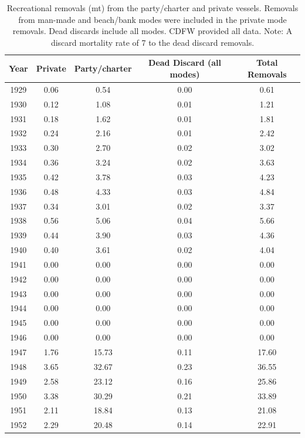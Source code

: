 \documentclass[12pt,]{article}
\begin{document}
\begin{longtable}{ccccc}
\caption{Recreational removals (mt) from the party/charter 
                                        and private vessels. Removals from man-made and 
                                        beach/bank modes were included in the private mode
                                        removals. Dead discards include all modes. CDFW provided 
                                        all data. Note: A discard mortality rate of 7%
                                        to the dead discard removals.} \\ 
  \hline
Year & Private & Party/charter & Dead Discard (all modes) & Total Removals \\ 
  \hline \endhead  \hline
1929 & 0.06 & 0.54 & 0.00 & 0.61 \\ 
  1930 & 0.12 & 1.08 & 0.01 & 1.21 \\ 
  1931 & 0.18 & 1.62 & 0.01 & 1.81 \\ 
  1932 & 0.24 & 2.16 & 0.01 & 2.42 \\ 
  1933 & 0.30 & 2.70 & 0.02 & 3.02 \\ 
  1934 & 0.36 & 3.24 & 0.02 & 3.63 \\ 
  1935 & 0.42 & 3.78 & 0.03 & 4.23 \\ 
  1936 & 0.48 & 4.33 & 0.03 & 4.84 \\ 
  1937 & 0.34 & 3.01 & 0.02 & 3.37 \\ 
  1938 & 0.56 & 5.06 & 0.04 & 5.66 \\ 
  1939 & 0.44 & 3.90 & 0.03 & 4.36 \\ 
  1940 & 0.40 & 3.61 & 0.02 & 4.04 \\ 
  1941 & 0.00 & 0.00 & 0.00 & 0.00 \\ 
  1942 & 0.00 & 0.00 & 0.00 & 0.00 \\ 
  1943 & 0.00 & 0.00 & 0.00 & 0.00 \\ 
  1944 & 0.00 & 0.00 & 0.00 & 0.00 \\ 
  1945 & 0.00 & 0.00 & 0.00 & 0.00 \\ 
  1946 & 0.00 & 0.00 & 0.00 & 0.00 \\ 
  1947 & 1.76 & 15.73 & 0.11 & 17.60 \\ 
  1948 & 3.65 & 32.67 & 0.23 & 36.55 \\ 
  1949 & 2.58 & 23.12 & 0.16 & 25.86 \\ 
  1950 & 3.38 & 30.29 & 0.21 & 33.89 \\ 
  1951 & 2.11 & 18.84 & 0.13 & 21.08 \\ 
  1952 & 2.29 & 20.48 & 0.14 & 22.91 \\ 

\end{longtable}
\end{document}
